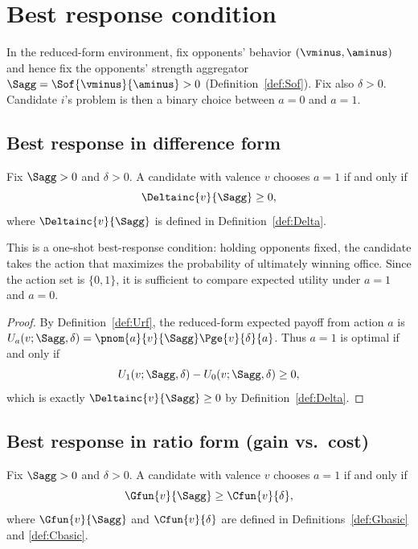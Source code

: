 \section{Best response condition}

In the reduced-form environment, fix opponents' behavior $(\vminus,\aminus)$ and hence fix the
opponents' strength aggregator $\Sagg = \Sof{\vminus}{\aminus} > 0$ (Definition~\ref{def:Sof}).
Fix also $\delta>0$. Candidate $i$'s problem is then a binary choice between $a=0$ and $a=1$.

\subsection{Best response in difference form}

\begin{prop}\label{prop:br}
Fix $\Sagg >0$ and $\delta > 0$. A candidate with valence $v$ chooses $a = 1$ if and only if
\[
    \Deltainc{v}{\Sagg} \ge 0,
\]
where $\Deltainc{v}{\Sagg}$ is defined in Definition~\ref{def:Delta}.
\end{prop}

\begin{remark*}
This is a one-shot best-response condition: holding opponents fixed, the candidate takes the action
that maximizes the probability of ultimately winning office. Since the action set is $\{0,1\}$, it is
sufficient to compare expected utility under $a=1$ and $a=0$.
\end{remark*}

\begin{proof}
By Definition~\ref{def:Urf}, the reduced-form expected payoff from action $a$ is
$U_a(v;\Sagg,\delta) = \pnom{a}{v}{\Sagg}\Pge{v}{\delta}{a}$.
Thus $a=1$ is optimal if and only if
\[
    U_1(v;\Sagg,\delta) - U_0(v;\Sagg,\delta) \ge 0,
\]
which is exactly $\Deltainc{v}{\Sagg} \ge 0$ by Definition~\ref{def:Delta}.
\end{proof}

\subsection{Best response in ratio form (gain vs.\ cost)}

\begin{corollary}\label{cor:BR}
Fix $\Sagg > 0$ and $\delta >0$. A candidate with valence $v$ chooses $a = 1$ if and only if
\[
    \Gfun{v}{\Sagg} \ge \Cfun{v}{\delta},
\]
where $\Gfun{v}{\Sagg}$ and $\Cfun{v}{\delta}$ are defined in
Definitions~\ref{def:Gbasic} and \ref{def:Cbasic}.
\end{corollary}

